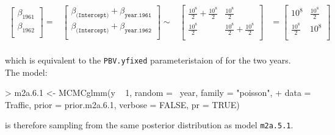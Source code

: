 \documentclass{article}
\begin{document}
\begin{equation}
\begin{array}{rccl}
\left[
\begin{array}{c}
 \beta_{1961}\\
 \beta_{1962}\\
\end{array}
\right]
=
&
\left[
\begin{array}{c}
 \beta_{\texttt{(Intercept)}}+\beta_{\texttt{year.1961}}\\
 \beta_{\texttt{(Intercept)}}+\beta_{\texttt{year.1962}}\\
\end{array}
\right]
\sim
&
\left[
\begin{array}{cc}
\frac{10^{8}}{2}+\frac{10^{8}}{2}&\frac{10^{8}}{2}\\
\frac{10^{8}}{2}&\frac{10^{8}}{2}+\frac{10^{8}}{2}\\
\end{array}
\right]
&=
\left[
\begin{array}{cc}
10^8&\frac{10^{8}}{2}\\
\frac{10^{8}}{2}&10^8\\
\end{array}
\right]
\\
\end{array}
\end{equation}

which is equivalent to the \texttt{PBV.yfixed} parameteristaion of for the two years.\\

The model:

\begin{Schunk}
\begin{Sinput}
> m2a.6.1 <- MCMCglmm(y ~ 1, random = ~year, family = "poisson", 
+     data = Traffic, prior = prior.m2a.6.1, verbose = FALSE, pr = TRUE)
\end{Sinput}
\end{Schunk}

is therefore sampling from the same posterior distribution as model \texttt{m2a.5.1}.
\ifalone
\end{document}
